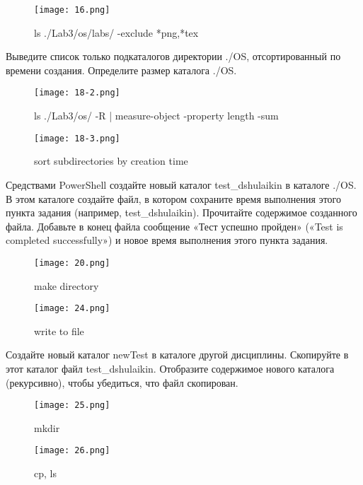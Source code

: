 \documentclass[a4paper]{article}
\begin{document}
\begin{figure}[H]
    \centering
    \texttt{[image: 16.png]}
    \caption{ls ./Lab3/os/labs/ -exclude *png,*tex }
\end{figure}

Выведите список только подкаталогов директории ./OS, отсортированный по времени создания. Определите размер каталога ./OS.


\begin{figure}[H]
    \centering
    \texttt{[image: 18-2.png]}
    \caption{ls ./Lab3/os/ -R | measure-object -property length -sum }
\end{figure}

\begin{figure}[H]
    \centering
    \texttt{[image: 18-3.png]}
    \caption{ sort subdirectories by creation time }
\end{figure}

Средствами PowerShell создайте новый каталог test\_dshulaikin в каталоге ./OS. В этом каталоге создайте файл, в котором сохраните время выполнения этого пункта задания (например, test\_dshulaikin). Прочитайте содержимое созданного файла. Добавьте в конец файла сообщение «Тест успешно пройден» («Test is completed successfully») и новое время выполнения этого пункта задания.

\begin{figure}[H]
    \centering
    \texttt{[image: 20.png]}
    \caption{ make directory }
\end{figure}


\begin{figure}[H]
    \centering
    \texttt{[image: 24.png]}
    \caption{ write to file }
\end{figure}

Создайте новый каталог newTest в каталоге другой дисциплины. Скопируйте в этот каталог файл test\_dshulaikin. Отобразите содержимое нового каталога (рекурсивно), чтобы убедиться, что файл скопирован.

\begin{figure}[H]
    \centering
    \texttt{[image: 25.png]}
    \caption{mkdir}
\end{figure}


\begin{figure}[H]
    \centering
    \texttt{[image: 26.png]}
    \caption{cp, ls}
\end{figure}
\end{document}
